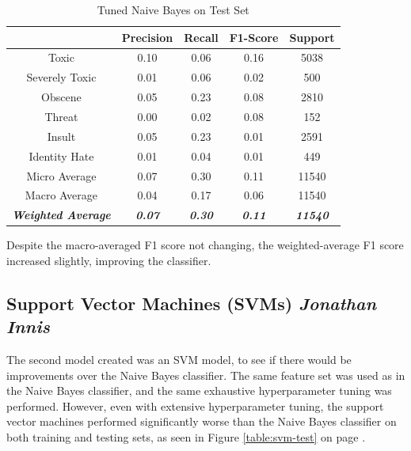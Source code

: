 \documentclass{article}
\begin{document}
{{	  \begin{table}[h!]
		  \centering
		  \begin{tabular}{|c|| c c c c|}
			  \hline
			                                     & Precision              & Recall                 & F1-Score               & Support                 \\ [0.5ex]
			  \hline\hline
			  Toxic                              & 0.10                   & 0.06                   & 0.16                   & 5038                    \\
			  Severely Toxic                     & 0.01                   & 0.06                   & 0.02                   & 500                     \\
			  Obscene                            & 0.05                   & 0.23                   & 0.08                   & 2810                    \\
			  Threat                             & 0.00                   & 0.02                   & 0.08                   & 152                     \\
			  Insult                             & 0.05                   & 0.23                   & 0.01                   & 2591                    \\
			  Identity Hate                      & 0.01                   & 0.04                   & 0.01                   & 449                     \\
			  \hline\hline
			  Micro Average                      & 0.07                   & 0.30                   & 0.11                   & 11540                   \\
			  Macro Average                      & 0.04                   & 0.17                   & 0.06                   & 11540                   \\
			  \textit{\textbf{Weighted Average}} & \textit{\textbf{0.07}} & \textit{\textbf{0.30}} & \textit{\textbf{0.11}} & \textit{\textbf{11540}} \\

			  \hline
		  \end{tabular}
		  \caption{Tuned Naive Bayes on Test Set}
		  \label{table:nb-test}
	  \end{table}

	  Despite the macro-averaged F1 score not changing, the weighted-average F1
	  score increased slightly, improving the classifier.
  }
  \subsection{Support Vector Machines (SVMs) \textit{Jonathan Innis}}{
	  The second model created was an SVM model, to see if there would be
	  improvements over the Naive Bayes classifier. The same feature set was used
	  as in the Naive Bayes classifier, and the same exhaustive hyperparameter
	  tuning was performed. However, even with extensive hyperparameter tuning,
	  the support vector machines performed significantly worse than the Naive
	  Bayes classifier on both training and testing sets, as seen in Figure
	  \ref{table:svm-test} on page \pageref{table:svm-test}.

}}
\end{document}
